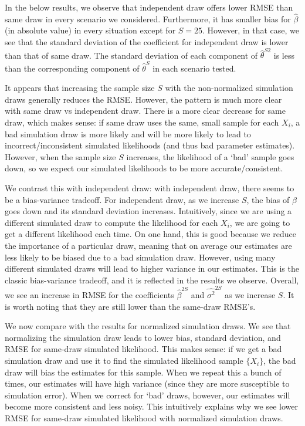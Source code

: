 \documentclass[12pt]{article}
\begin{document}
In the below results, we observe that independent draw offers lower RMSE than same draw in every scenario we considered. Furthermore, it has smaller bias for $\hat{\beta}$ (in absolute value) in every situation except for $S = 25$. However, in that case, we see that the standard deviation of the coefficient for independent draw is lower than that of same draw. The standard deviation of each component of $\hat{\theta}^{S2}$ is less than the corresponding component of $\hat{\theta}^S$ in each scenario tested.

It appears that increasing the sample size $S$ with the non-normalized simulation draws generally reduces the RMSE. However, the pattern is much more clear with same draw vs independent draw. There is a more clear decrease for same draw, which makes sense: if same draw uses the same, small sample for each $X_i$, a bad simulation draw is more likely and will be more likely to lead to incorrect/inconsistent simulated likelihoods (and thus bad parameter estimates). However, when the sample size $S$ increases, the likelihood of a `bad' sample goes down, so we expect our simulated likelihoods to be more accurate/consistent.

We contrast this with independent draw: with independent draw, there seems to be a bias-variance tradeoff. For independent draw, as we increase $S$, the bias of $\beta$ goes down and its standard deviation increases. Intuitively, since we are using a different simulated draw to compute the likelihood for each $X_i$, we are going to get a different likelihood each time. On one hand, this is good because we reduce the importance of a particular draw, meaning that on average our estimates are less likely to be biased due to a bad simulation draw. However, using many different simulated draws will lead to higher variance in our estimates. This is the classic bias-variance tradeoff, and it is reflected in the results we observe. Overall, we see an increase in RMSE for the coefficients $\hat{\beta}^{2S}$ and $\hat{\sigma^2}^{2S}$ as we increase $S$. It is worth noting that they are still lower than the same-draw RMSE's. 

We now compare with the results for normalized simulation draws. We see that normalizing the simulation draw leads to lower bias, standard deviation, and RMSE for same-draw simulated likelihood. This makes sense: if we get a bad simulation draw and use it to find the simulated likelihood sample $\{X_i\}$, the bad draw will bias the estimates for this sample. When we repeat this a bunch of times, our estimates will have high variance (since they are more susceptible to simulation error). When we correct for `bad' draws, however, our estimates will become more consistent and less noisy. This intuitively explains why we see lower RMSE for same-draw simulated likelihood with normalized simulation draws.
\end{document}
